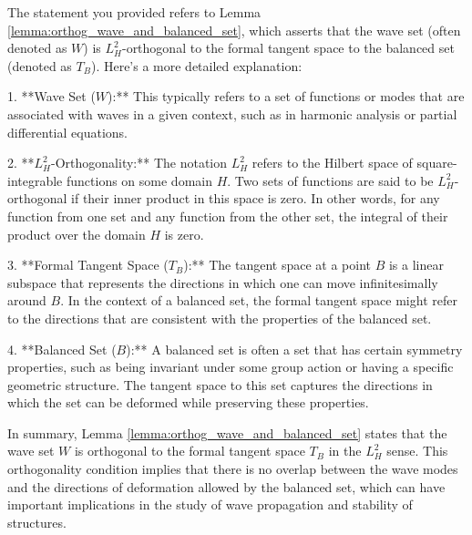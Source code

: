 The statement you provided refers to Lemma \ref{lemma:orthog_wave_and_balanced_set}, which asserts that the wave set (often denoted as \( W \)) is \( L^2_H \)-orthogonal to the formal tangent space to the balanced set (denoted as \( T_B \)). Here's a more detailed explanation:

1. **Wave Set (\( W \)):** This typically refers to a set of functions or modes that are associated with waves in a given context, such as in harmonic analysis or partial differential equations.

2. **\( L^2_H \)-Orthogonality:** The notation \( L^2_H \) refers to the Hilbert space of square-integrable functions on some domain \( H \). Two sets of functions are said to be \( L^2_H \)-orthogonal if their inner product in this space is zero. In other words, for any function from one set and any function from the other set, the integral of their product over the domain \( H \) is zero.

3. **Formal Tangent Space (\( T_B \)):** The tangent space at a point \( B \) is a linear subspace that represents the directions in which one can move infinitesimally around \( B \). In the context of a balanced set, the formal tangent space might refer to the directions that are consistent with the properties of the balanced set.

4. **Balanced Set (\( B \)):** A balanced set is often a set that has certain symmetry properties, such as being invariant under some group action or having a specific geometric structure. The tangent space to this set captures the directions in which the set can be deformed while preserving these properties.

In summary, Lemma \ref{lemma:orthog_wave_and_balanced_set} states that the wave set \( W \) is orthogonal to the formal tangent space \( T_B \) in the \( L^2_H \) sense. This orthogonality condition implies that there is no overlap between the wave modes and the directions of deformation allowed by the balanced set, which can have important implications in the study of wave propagation and stability of structures.